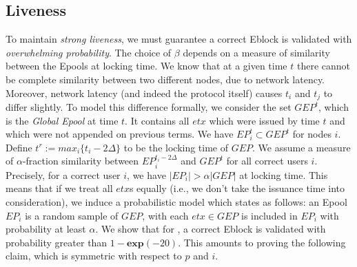 








\subsection{Liveness} \label{Liveness}
To maintain \emph{strong liveness}, we must guarantee a correct Eblock is validated with \emph{overwhelming probability}. The choice of $\beta$ depends on a measure of similarity between the Epools at locking time. We know that at a given time $t$ there cannot be complete similarity between two different nodes, due to network latency. Moreover, network latency (and indeed the protocol itself) causes $t_i$ and $t_j$ to differ slightly. To model this difference formally, we consider the set $GEP^t$, which is the \textit{Global Epool} at time $t$. It contains all $etx$ which were issued by time $t$ and which were not appended on previous terms. We have $EP_i^t\subset GEP^t$ for nodes $i$. Define $t^r:=max_i\{t_i-2\Delta\}$ to be the locking time of $GEP$. We assume a measure of $\alpha$-fraction similarity between $EP_i^{t_i-2\Delta}$ and $GEP^t$ for all correct users $i$. Precisely, for a correct user $i$, we have $|EP_i|>\alpha|GEP|$ at locking time. This means that if we treat all $etx$s equally (i.e., we don't take the issuance time into consideration), we induce a probabilistic model which states as follows: an Epool $EP_i$ is a random sample of $GEP$, with each $etx\in GEP$ is included in $EP_i$ with probability at least $\alpha$.  
We show that for , a correct Eblock is validated with probability greater than $1-\textbf{exp}(-20)$. This amounts to proving the following claim, which is symmetric with respect to $p$ and $i$.

